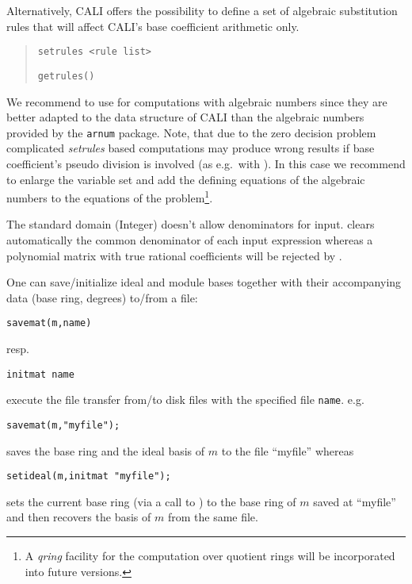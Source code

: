 Alternatively, CALI offers the possibility to define a set of
algebraic substitution rules that will affect CALI's base coefficient
arithmetic only.
\begin{quote}
\verb|setrules <rule list>|


\verb|getrules()|

\end{quote}

We recommend to use  for computations with algebraic
numbers since they are better adapted to the data structure of CALI
than the algebraic numbers provided by the {\tt arnum} package.
Note, that due to the zero decision problem
complicated {\em setrules} based computations may produce wrong
results if base coefficient's pseudo division is involved (as e.g.\
with ). In this case we recommend to enlarge
the variable set and add the defining equations of the algebraic
numbers to the equations of the problem\footnote{A {\em qring}
facility for the computation over quotient rings will be incorporated
into future versions.}.
\medskip

The standard domain (Integer) doesn't allow denominators for input.
\ind{setideal} clears automatically the common denominator of each
input expression whereas a polynomial matrix with true rational
coefficients will be rejected by .
\medskip

One can save/initialize ideal and module bases together with their
accompanying data (base ring, degrees) to/from a file:
\begin{verbatim}
savemat(m,name)
\end{verbatim}
resp.
\begin{verbatim}
initmat name
\end{verbatim} execute the file transfer from/to disk files with the
specified file {\tt name}. e.g.\
\begin{verbatim}
savemat(m,"myfile");
\end{verbatim}
saves the base ring and the ideal basis of $m$ to the file ``myfile''
whereas
\begin{verbatim}
setideal(m,initmat "myfile");
\end{verbatim}
sets the current base ring (via a call to ) to the base
ring of $m$ saved at ``myfile'' and then recovers the basis of $m$
from the same file.

